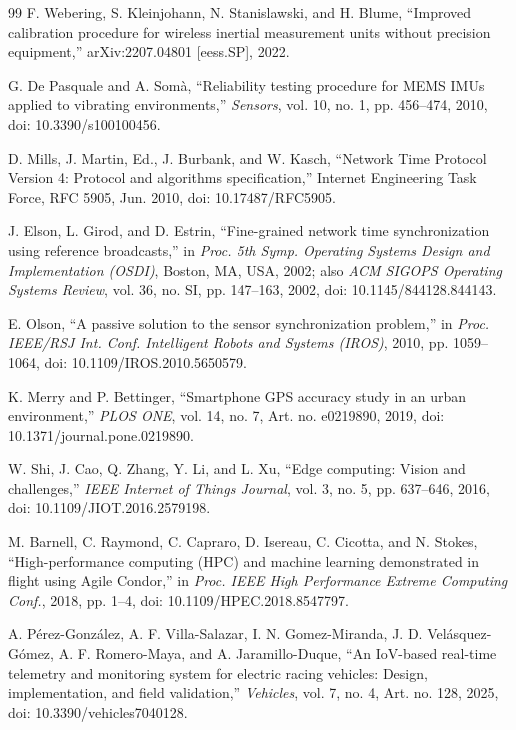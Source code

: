 \begin{thebibliography}{99}
 F. Webering, S. Kleinjohann, N. Stanislawski, and H. Blume, ``Improved calibration procedure for wireless inertial measurement units without precision equipment,'' arXiv:2207.04801 [eess.SP], 2022.

 G. De Pasquale and A. Som\`a, ``Reliability testing procedure for MEMS IMUs applied to vibrating environments,'' \emph{Sensors}, vol. 10, no. 1, pp. 456--474, 2010, doi: 10.3390/s100100456.

 D. Mills, J. Martin, Ed., J. Burbank, and W. Kasch, ``Network Time Protocol Version 4: Protocol and algorithms specification,'' Internet Engineering Task Force, RFC 5905, Jun. 2010, doi: 10.17487/RFC5905.

 J. Elson, L. Girod, and D. Estrin, ``Fine-grained network time synchronization using reference broadcasts,'' in \emph{Proc. 5th Symp. Operating Systems Design and Implementation (OSDI)}, Boston, MA, USA, 2002; also \emph{ACM SIGOPS Operating Systems Review}, vol. 36, no. SI, pp. 147--163, 2002, doi: 10.1145/844128.844143.

 E. Olson, ``A passive solution to the sensor synchronization problem,'' in \emph{Proc. IEEE/RSJ Int. Conf. Intelligent Robots and Systems (IROS)}, 2010, pp. 1059--1064, doi: 10.1109/IROS.2010.5650579.

 K. Merry and P. Bettinger, ``Smartphone GPS accuracy study in an urban environment,'' \emph{PLOS ONE}, vol. 14, no. 7, Art. no. e0219890, 2019, doi: 10.1371/journal.pone.0219890.

 W. Shi, J. Cao, Q. Zhang, Y. Li, and L. Xu, ``Edge computing: Vision and challenges,'' \emph{IEEE Internet of Things Journal}, vol. 3, no. 5, pp. 637--646, 2016, doi: 10.1109/JIOT.2016.2579198.

 M. Barnell, C. Raymond, C. Capraro, D. Isereau, C. Cicotta, and N. Stokes, ``High-performance computing (HPC) and machine learning demonstrated in flight using Agile Condor,'' in \emph{Proc. IEEE High Performance Extreme Computing Conf.}, 2018, pp. 1--4, doi: 10.1109/HPEC.2018.8547797.

 A. P\'erez-Gonz\'alez, A. F. Villa-Salazar, I. N. Gomez-Miranda, J. D. Vel\'asquez-G\'omez, A. F. Romero-Maya, and A. Jaramillo-Duque, ``An IoV-based real-time telemetry and monitoring system for electric racing vehicles: Design, implementation, and field validation,'' \emph{Vehicles}, vol. 7, no. 4, Art. no. 128, 2025, doi: 10.3390/vehicles7040128.


\end{thebibliography}
